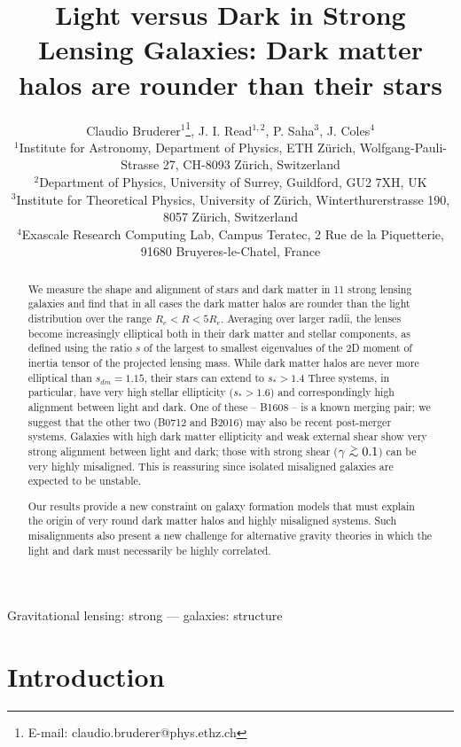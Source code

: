 \documentclass[useAMS,usenatbib]{mn2e}
\title[Light versus Dark in Strong Lensing Galaxies]{Light versus Dark in Strong  Lensing Galaxies: Dark matter halos are rounder than their stars}
\author[Bruderer]{Claudio Bruderer$^{1}$\thanks{E-mail: claudio.bruderer@phys.ethz.ch}, J. I. Read$^{1,2}$, P. Saha$^{3}$, J. Coles$^{4}$\\
$^{1}$Institute for Astronomy, Department of Physics, ETH Z\"urich, Wolfgang-Pauli-Strasse 27, CH-8093 Z\"urich, Switzerland\\
$^{2}$Department of Physics, University of Surrey, Guildford, GU2 7XH, UK\\
$^{3}$Institute for Theoretical Physics, University of Z\"urich, Winterthurerstrasse 190, 8057 Z\"urich, Switzerland\\
$^{4}$Exascale Research Computing Lab, Campus Teratec, 2 Rue de la Piquetterie, 91680 Bruyeres-le-Chatel, France
}
\def\gtsima{$\; \buildrel > \over \sim \;$}
\def\simgt{\lower.5ex\hbox{\gtsima}}
\begin{document}
\maketitle

\begin{abstract}
We measure the shape and alignment of stars and dark matter in 11 strong
lensing galaxies and find that in all cases the dark matter halos are rounder
than the light distribution over the range $R_e < R < 5R_e$.  Averaging over
larger radii, the lenses become increasingly elliptical both in their dark
matter and stellar components, as defined using the ratio $s$ of the largest to
smallest eigenvalues of the 2D moment of inertia tensor of the projected
lensing mass.  While dark matter halos are never more elliptical than $s_{dm} =
1.15$, their stars can extend to $s_* > 1.4$ Three systems, in particular, have
very high stellar ellipticity ($s_* > 1.6$) and correspondingly high alignment
between light and dark. One of these -- B1608 -- is a known merging pair; we
suggest that the other two (B0712 and B2016) may also be recent post-merger
systems.  Galaxies with high dark matter ellipticity and weak external shear
show very strong alignment between light and dark; those with strong shear
($\gamma \simgt 0.1$) can be very highly misaligned. This is reassuring since
isolated misaligned galaxies are expected to be unstable. 

Our results provide a new constraint on galaxy formation models that must
explain the origin of very round dark matter halos and highly misaligned
systems. Such misalignments also present a new challenge for alternative
gravity theories in which the light and dark must necessarily be highly
correlated.

\end{abstract}

\begin{keywords}
Gravitational lensing: strong --- galaxies: structure
\end{keywords}


\section{Introduction}\label{sec:introduction}
\end{document}
